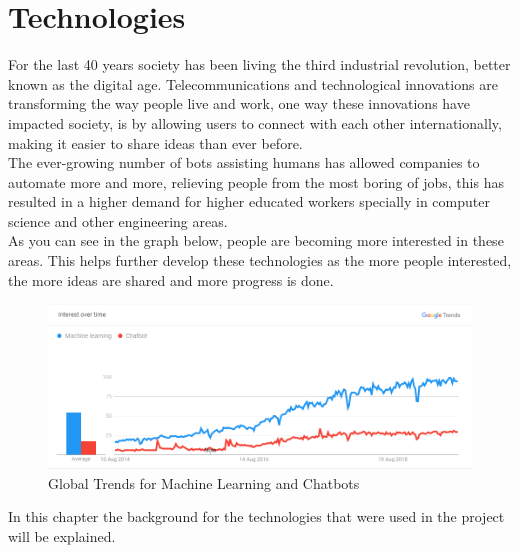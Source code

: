 \chapter{Technologies}\label{sec:chap:2}

For the last 40 years society has been living the third industrial revolution, better known as the digital age. Telecommunications and technological innovations are transforming the way people live and work, one way these innovations have impacted society, is by allowing users to connect with each other internationally, making it easier to share ideas than ever before. \\

The ever-growing number of bots assisting humans has allowed companies to automate more and more, relieving people from the most boring of jobs, this has resulted in a higher demand for higher educated workers specially in computer science and other engineering areas.\\

As you can see in the graph below, people are becoming more interested in these areas. This helps further develop these technologies as the more people interested, the more ideas are shared and more progress is done.\\

\begin{center}
	\begin{figure}[h!]
		\centering
		\includegraphics[scale=0.6]{./images/3-mach-chat-trend}
		\caption{Global Trends for Machine Learning and Chatbots}
		\label{global-trends-mach-chat}
	\end{figure}
\end{center}

In this chapter the background for the technologies that were used in the project will be explained. \\


